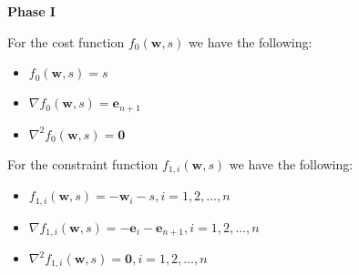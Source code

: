 \documentclass{beamer}
\begin{document}
\begin{frame}

\textbf{Phase I}

\vspace{0.8cm}
\justifying

\justifying
For the cost function $f_{0}\left(\mathbf{w},s\right)$ we have the following:
\begin{itemize}
	\item $f_{0}\left(\mathbf{w},s\right) = s$
	\item $\nabla f_{0}\left(\mathbf{w},s\right) = \mathbf{e}_{n+1}$
	\item $\nabla^{2}f_{0}\left(\mathbf{w},s\right) = \mathbf{0}$
\end{itemize}

\vspace{0.8cm}
\justifying
For the constraint function $f_{1,i}\left(\mathbf{w},s\right)$ we have the following:
\begin{itemize}
	\item $f_{1,i}\left(\mathbf{w},s\right) = - \mathbf{w}_{i} - s, i=1,2,\dots,n$
	\item $\nabla f_{1,i}\left(\mathbf{w},s\right) = - \mathbf{e}_{i} - \mathbf{e}_{n+1}, i=1,2,\dots,n$
	\item $\nabla^{2}f_{1,i}\left(\mathbf{w},s\right) = \mathbf{0}, i=1,2,\dots,n$
\end{itemize}

\end{frame}
\end{document}
